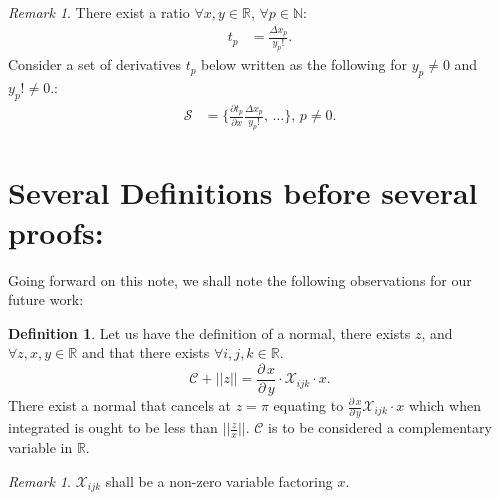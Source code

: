 \documentclass[10pt]{article}
\theoremstyle{plain}
\theoremstyle{definition}
\newtheorem{definition}[theorem]{Definition}
\theoremstyle{remark}
\newtheorem{remark}[theorem]{Remark}
\begin{document}
\begin{remark}
There exist a ratio $\forall x, y \in \mathbb{R}$, $\forall p \in \mathbb{N}$:
\begin{align*}
	t_p &= \frac{\Delta x_p}{y_p!}.
\end{align*}
Consider a set of derivatives $t_p$ below written as the following for $y_p \neq 0$ and $y_p! \neq 0$.:
\begin{align*}
	\mathcal{S} &= \{ \frac{\partial t_p}{\partial x} \frac{\Delta x_p}{y_p!}, \, \dots \}, \, p \neq 0.
\end{align*}
\end{remark}

\section{Several Definitions before several proofs:}

Going forward on this note, we shall note the following observations for our future work:

\begin{definition}
	Let us have the definition of a normal, there exists $z$, and $\forall z, x, y \in \mathbb{R}$ and that there exists $\forall i, j, k \in \mathbb{R}$.
	\begin{equation}
		\mathcal{C} + ||z|| = \frac{\partial \, x}{\partial \, y} \cdot \mathcal{X}_{ijk} \cdot x.
	\end{equation}
	There exist a normal that cancels at $z=\pi$ equating to $\frac{\partial \, x}{\partial \, y} \mathcal{X}_{ijk} \cdot x$ which when integrated is ought to be less than $||\frac{z}{x}||$. $\mathcal{C}$ is to be considered a complementary variable in $\mathbb{R}$.
\end{definition}

\begin{remark}
	$\mathcal{X}_{ijk}$ shall be a non-zero variable factoring $x$.
\end{remark}
\end{document}
